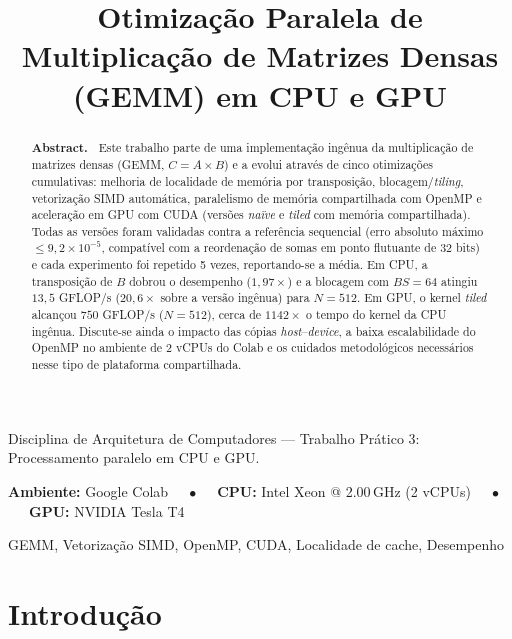 \documentclass{sbc2023}%
\title[Otimização Paralela de GEMM]{Otimização Paralela de Multiplicação de Matrizes Densas (GEMM) em CPU e GPU}
\author[Grupo 202X]{
\affil{\textbf{Nome do(a) Aluno(a) 1}~\textcolor{blue}{\faEnvelopeO}~~[~\textbf{Instituição}~|\href{mailto:email@dominio}{~\textbf{\textit{email@dominio}}}~]}

\affil{\textbf{Nome do(a) Aluno(a) 2}~~[~\textbf{Instituição}~|\href{mailto:email@dominio}{~\textbf{\textit{email@dominio}}}~]}
}
\begin{document}
\begin{frontmatter}
\maketitle

\begin{mail}
Disciplina de Arquitetura de Computadores --- Trabalho Prático 3: Processamento paralelo em CPU e GPU.
\end{mail}

\begin{dates}
\small{\textbf{Ambiente:} Google Colab~~~$\bullet$~~~\textbf{CPU:} Intel Xeon @ 2.00\,GHz (2 vCPUs)~~~$\bullet$~~~\textbf{GPU:} NVIDIA Tesla T4}
\end{dates}

\begin{abstract}
\textbf{Abstract.~}
\noindent Este trabalho parte de uma implementação ingênua da multiplicação de matrizes densas (GEMM, $C = A \times B$) e a evolui através de cinco otimizações cumulativas: melhoria de localidade de memória por transposição, blocagem/\textit{tiling}, vetorização SIMD automática, paralelismo de memória compartilhada com OpenMP e aceleração em GPU com CUDA (versões \textit{naïve} e \textit{tiled} com memória compartilhada). Todas as versões foram validadas contra a referência sequencial (erro absoluto máximo $\leq 9{,}2\times10^{-5}$, compatível com a reordenação de somas em ponto flutuante de 32 bits) e cada experimento foi repetido 5 vezes, reportando-se a média. Em CPU, a transposição de $B$ dobrou o desempenho ($1{,}97\times$) e a blocagem com $BS=64$ atingiu $13{,}5$ GFLOP/s ($20{,}6\times$ sobre a versão ingênua) para $N=512$. Em GPU, o kernel \textit{tiled} alcançou $750$ GFLOP/s ($N=512$), cerca de $1142\times$ o tempo do kernel da CPU ingênua. Discute-se ainda o impacto das cópias \textit{host}--\textit{device}, a baixa escalabilidade do OpenMP no ambiente de 2 vCPUs do Colab e os cuidados metodológicos necessários nesse tipo de plataforma compartilhada.
\end{abstract}

\begin{keywords}
GEMM, Vetorização SIMD, OpenMP, CUDA, Localidade de cache, Desempenho
\end{keywords}

\end{frontmatter}


\section{Introdução}
\label{sec:intro}
\end{document}
